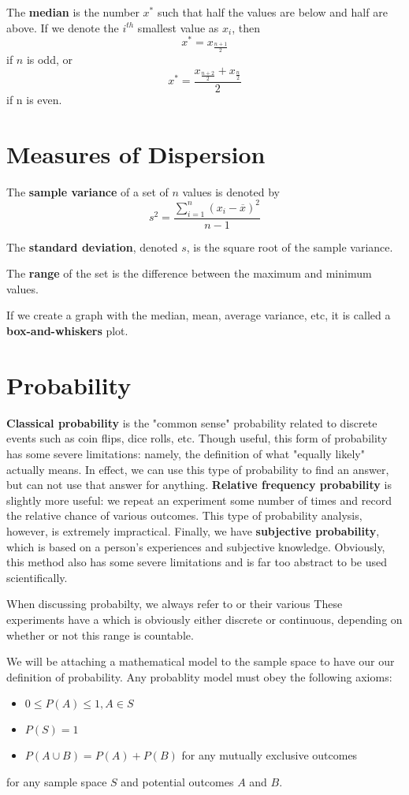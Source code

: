 \documentclass[12pt]{article}
\begin{document}
The {\bf median} is the number $x^*$ such that half the values are below and half are above. If we denote the $i^{th}$ smallest value as $x_i$, then \[ x^* = x_{\frac{n+1}{2}} \] if $n$ is odd, or \[ x^* = \frac{x_{\frac{n+2}{2}} + x_\frac{n}{2}}{2} \] if n is even.

\section*{Measures of Dispersion}
The {\bf sample variance} of a set of $n$ values is denoted by \[ s^2 = \frac{\displaystyle\sum_{i=1}^n (x_i - \overline{x})^2}{n-1} \]

The {\bf standard deviation}, denoted $s$, is the square root of the sample variance.

The {\bf range} of the set is the difference between the maximum and minimum values.

If we create a graph with the median, mean, average variance, etc, it is called a {\bf box-and-whiskers} plot.

\section*{Probability}
{\bf Classical probability} is the "common sense" probability related to discrete events such as coin flips, dice rolls, etc. Though useful, this form of probability has some severe limitations: namely, the definition of what "equally likely" actually means. In effect, we can use this type of probability to find an answer, but can not use that answer for anything. {\bf Relative frequency probability} is slightly more useful: we repeat an experiment some number of times and record the relative chance of various outcomes. This type of probability analysis, however, is extremely impractical. Finally, we have {\bf subjective probability}, which is based on a person's experiences and subjective knowledge. Obviously, this method also has some severe limitations and is far too abstract to be used scientifically.

When discussing probabilty, we always refer to  or their various  These experiments have a  which is obviously either discrete or continuous, depending on whether or not this range is countable.

We will be attaching a mathematical model to the sample space to have our our definition of probability. Any probablity model must obey the following axioms:
\begin{itemize}
\item $0 \leq P(A) \leq 1, A \in S$
\item $P(S) = 1$
\item $P(A \cup B) = P(A) + P(B)$ for any mutually exclusive outcomes
\end{itemize}
for any sample space $S$ and potential outcomes $A$ and $B$.
\end{document}
